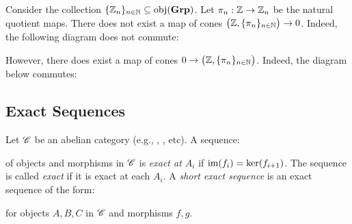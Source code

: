 \begin{example}
	Consider the collection $\{\mathbb{Z}_n\}_{n \in \mathbb{N}} \subseteq \operatorname{obj}({\normalfont\textbf{Grp}})$. Let $\pi_n :\mathbb{Z} \rightarrow \mathbb{Z}_n$ be the natural quotient maps. There does not exist a map of cones $\bigl( \mathbb{Z} , \{\pi_n\}_{n \in \mathbb{N}}\bigr)\rightarrow 0$. Indeed, the following diagram does not commute:
	\begin{center}
	\end{center}
	However, there does exist a map of cones $0 \rightarrow \bigl( \mathbb{Z}, \{\pi_n\}_{n \in \mathbb{N}} \bigr)$. Indeed, the diagram below commutes:
	\begin{center}
	\end{center}
\end{example}

\subsection{Exact Sequences}

\begin{definition}
	Let $\mathscr{C}$ be an abelian category (e.g., , , etc). A sequence:
	\begin{center}
	\end{center}
	of objects and morphisms in $\mathscr{C}$ is \emph{exact at $A_i$} if $\operatorname{im}(f_i) = \ker(f_{i + 1})$. The sequence is called \emph{exact} if it is exact at each $A_i$. A \emph{short exact sequence} is an exact sequence of the form:
	\begin{center}
	\end{center}
	for objects $A,B,C$ in $\mathscr{C}$ and morphisms $f,g$.
\end{definition}

